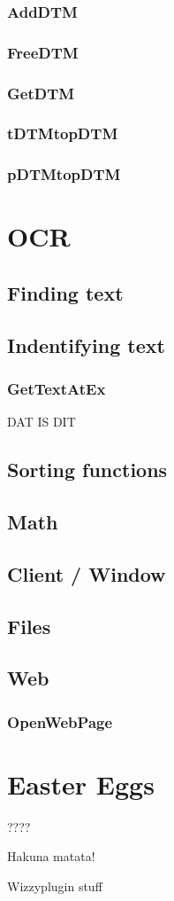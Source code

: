 \documentclass[a4paper]{report}
\begin{document}
\subsection{AddDTM}

\subsection{FreeDTM}

\subsection{GetDTM}

\subsection{tDTMtopDTM}

\subsection{pDTMtopDTM}


\chapter{OCR}

\section{Finding text}

\section{Indentifying text}

\subsection{GetTextAtEx}
DAT IS DIT

\section{Sorting functions}

\section{Math}

\section{Client / Window}

\section{Files}

\section{Web}
\subsection{OpenWebPage}

\chapter{Easter Eggs}
????

Hakuna matata!

Wizzyplugin stuff
\end{document}
